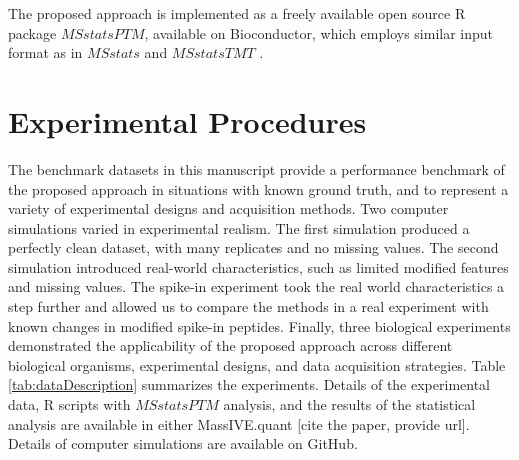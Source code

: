 \documentclass[mcp]{article}
\numberwithin{table}{section}
\def\todo#1{{\color{red}[#1]}}
\begin{document}
The proposed approach is implemented as a freely available open source R package $MSstatsPTM$, available on Bioconductor, which employs similar input format as in $MSstats$ and $MSstatsTMT$ \cite{Choi:2014,Huang:2020}.

\section{Experimental Procedures}

The benchmark datasets in this manuscript provide a performance benchmark of the proposed approach in situations with known ground truth, and to represent a variety of experimental designs and acquisition methods. Two computer simulations varied in experimental realism. The first simulation produced a perfectly clean dataset, with many replicates and no missing values. The second simulation introduced real-world characteristics, such as limited modified features and missing values. The spike-in experiment took the real world characteristics a step further and allowed us to compare the methods in a real experiment with known changes in modified spike-in peptides. Finally, three biological experiments demonstrated the applicability of the proposed approach across different biological organisms, experimental designs, and data acquisition strategies. Table \ref{tab:dataDescription} summarizes the experiments. Details of the experimental data, R scripts with $MSstatsPTM$ analysis, and the results of the statistical analysis are available in either MassIVE.quant \todo{cite the paper, provide url}. Details of computer simulations are available on GitHub.
\end{document}
